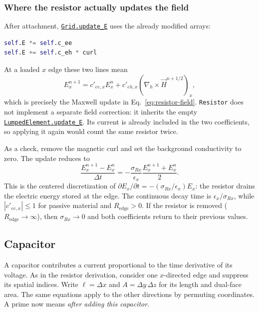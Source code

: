 \documentclass[10pt]{article}
\newcommand{\sourcecode}[2]{\href{https://github.com/tiagovla/fdtd.py/blob/7027c252cd23b6cfb8cb197e361dacfac9fd1c72/#1}{\texttt{#2}}}
\begin{document}
\subsubsection{Where the resistor actually updates the field}
After attachment, \sourcecode{fdtd/grid.py\#L390-L403}{Grid.update\_E}
uses the already modified arrays:
\begin{lstlisting}[language=Python,basicstyle=\small\ttfamily,columns=fullflexible]
self.E *= self.c_ee
self.E += self.c_eh * curl
\end{lstlisting}
At a loaded $x$ edge these two lines mean
\begin{equation}
    E_x^{n+1}=c'_{ee,x}E_x^n
        +c'_{eh,x}(\nabla_h\times\vec H^{n+1/2})_x,
\end{equation}
which is precisely the Maxwell update in Eq.~\eqref{eq:resistor-field}.
\texttt{Resistor} does not implement a separate field correction:
it inherits the empty
\sourcecode{fdtd/lumped_elements.py\#L72-L73}{LumpedElement.update\_E}.
Its current is already included in the two coefficients, so applying it
again would count the same resistor twice.

As a check, remove the magnetic curl and set the background conductivity
to zero. The update reduces to
\begin{equation}
    \frac{E_x^{n+1}-E_x^n}{\Delta t}
       =-\frac{\sigma_{Rx}}{\epsilon_x}
          \frac{E_x^{n+1}+E_x^n}{2}.
\end{equation}
This is the centered discretization of
$\partial E_x/\partial t=-(\sigma_{Rx}/\epsilon_x)E_x$:
the resistor drains the electric energy stored at the edge. The continuous
decay time is $\epsilon_x/\sigma_{Rx}$, while
$|c'_{ee,x}|\leq1$ for passive material and $R_{\mathrm{edge}}>0$.
If the resistor is removed ($R_{\mathrm{edge}}\to\infty$), then
$\sigma_{Rx}\to0$ and both coefficients return to their previous values.

\subsection{Capacitor}
\label{sec:capacitor}
A capacitor contributes a current proportional to the time derivative of
its voltage. As in the resistor derivation, consider one $x$-directed edge
and suppress its spatial indices. Write $\ell=\Delta x$ and
$A=\Delta y\,\Delta z$ for its length and dual-face area. The same equations
apply to the other directions by permuting coordinates. A prime now means
\emph{after adding this capacitor}.
\end{document}
